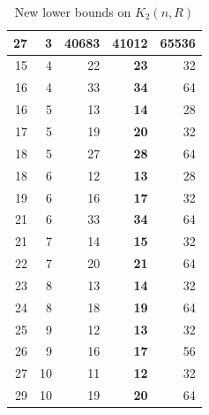 \documentclass[10pt,a4paper]{article}
\theoremstyle{definition}
\begin{document}
\begin{table}[H]
\begin{center}
\begin{minipage}[t]{.47\linewidth}
\begin{tabular}{| r | r|| r |>{\bfseries}r | r|}
      27 & 3  & 40683 & 41012  & 65536   \\\hline          
      15 & 4  & 22 & 23  & 32 \\       
      16 & 4  & 33 & 34  & 64 \\   \hline  
      16 & 5  & 13 & 14  & 28 \\       
      17 & 5  & 19 & 20  & 32  \\    
      18 & 5  & 27 & 28  & 64   \\    \hline    
      18 & 6  & 12 & 13  & 28  \\         
      19 & 6  & 16 & 17  & 32  \\       
      21 & 6  & 33 & 34  & 64  \\    \hline 
      21 & 7  & 14 & 15  & 32  \\         
      22 & 7  & 20 & 21  & 64  \\  \hline      
      23 & 8  & 13 & 14  & 32   \\      
      24 & 8  & 18 & 19  & 64  \\   \hline     
      25 & 9  & 12 & 13  & 32  \\  
      26 & 9  & 16 & 17  & 56  \\    \hline    
      27 & 10  & 11 & 12 & 32   \\  
      29 & 10  & 19 & 20 & 64  \\             
    \hline 
    \end{tabular}\end{minipage}    
\end{center}
  \caption{New lower bounds on $K_2(n,R)$}\label{binarytable}
\end{table} 
\end{document}
